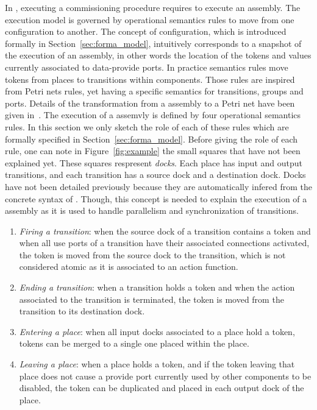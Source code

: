 In \mad, executing a commissioning procedure requires to execute an
assembly. The \mad execution model is governed by operational
semantics rules to move from one configuration to another. The concept
of configuration, which is introduced formally in
Section~\ref{sec:forma_model}, intuitively corresponds to a snapshot
of the execution of an assembly, in other words the location of the
tokens and values currently associated to data-provide ports. In
practice semantics rules move tokens from places to transitions within
components. Those rules are inspired from Petri nets rules, yet having
a specific semantics for transitions, groups and ports. Details of the
transformation from a \mad assembly to a Petri net have been given
in~\cite{coullon:hal-02323641}. The execution of a \mad assemvly is
defined by four operational semantics rules. In this section we only
sketch the role of each of these rules which are formally specified in
Section~\ref{sec:forma_model}. Before giving the role of each rule,
one can note in Figure~\ref{fig:example} the small squares that have
not been explained yet. These squares respresent \emph{docks}. Each
place has input and output transitions, and each transition has a
source dock and a destination dock. Docks have not been detailed
previously because they are automatically infered from the concrete
syntax of \mad. Though, this concept is needed to explain the
execution of a \mad assembly as it is used to handle parallelism and
synchronization of transitions.
%
\begin{enumerate}
\item \emph{Firing a transition}: when the source dock of a transition
  contains a token and when all use ports of a transition have their
  associated connections activated, the token is moved from the source
  dock to the transition, which is not considered atomic as it is
  associated to an action function.
\item \emph{Ending a transition}: when a transition holds a token and
  when the action associated to the transition is terminated, the
  token is moved from the transition to its destination dock.
\item \emph{Entering a place}: when all input docks associated to a
  place hold a token, tokens can be merged to a single one placed
  within the place.
\item \emph{Leaving a place}: when a place holds a token, and if the
  token leaving that place does not cause a provide port currently
  used by other components to be disabled,
  the token can be duplicated and placed in each output dock of the
  place.
\end{enumerate}

